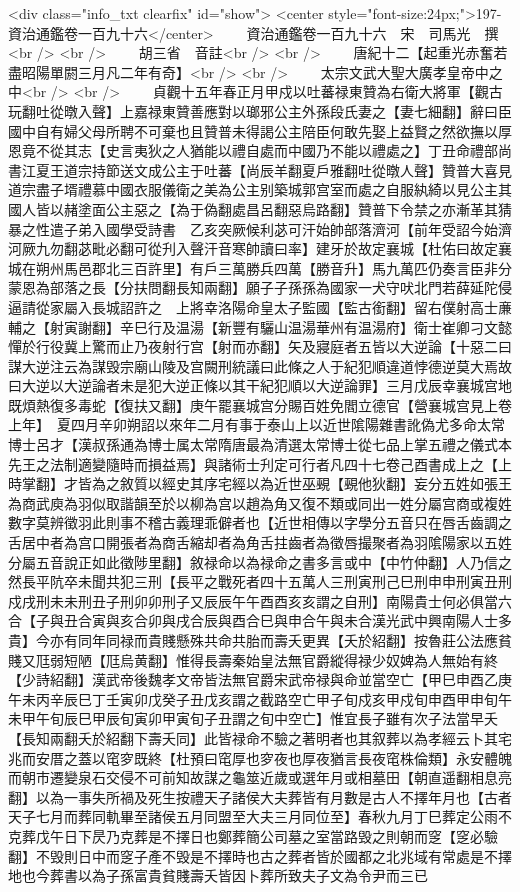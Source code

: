 <div class="info_txt clearfix" id="show">
<center style="font-size:24px;">197-資治通鑑卷一百九十六</center>
  　　資治通鑑卷一百九十六　宋　司馬光　撰<br />
<br />
　　胡三省　音註<br />
<br />
　　唐紀十二【起重光赤奮若盡昭陽單閼三月凡二年有奇】<br />
<br />
　　太宗文武大聖大廣孝皇帝中之中<br />
<br />
　　貞觀十五年春正月甲戍以吐蕃禄東贊為右衛大將軍【觀古玩翻吐從暾入聲】上嘉禄東贊善應對以瑯邪公主外孫段氏妻之【妻七細翻】辭曰臣國中自有婦父母所聘不可棄也且贊普未得謁公主陪臣何敢先娶上益賢之然欲撫以厚恩竟不從其志【史言夷狄之人猶能以禮自處而中國乃不能以禮處之】丁丑命禮部尚書江夏王道宗持節送文成公主于吐蕃【尚辰羊翻夏戶雅翻吐從暾人聲】贊普大喜見道宗盡子壻禮慕中國衣服儀衛之美為公主别築城郭宫室而處之自服紈綺以見公主其國人皆以赭塗面公主惡之【為于偽翻處昌呂翻惡烏路翻】贊普下令禁之亦漸革其猜暴之性遣子弟入國學受詩書　乙亥突厥候利苾可汗始帥部落濟河【前年受詔今始濟河厥九勿翻苾毗必翻可從刋入聲汗音寒帥讀曰率】建牙於故定襄城【杜佑曰故定襄城在朔州馬邑郡北三百許里】有戶三萬勝兵四萬【勝音升】馬九萬匹仍奏言臣非分蒙恩為部落之長【分扶問翻長知兩翻】願子子孫孫為國家一犬守吠北門若薛延陀侵逼請從家屬入長城詔許之　上將幸洛陽命皇太子監國【監古銜翻】留右僕射高士亷輔之【射寅謝翻】辛巳行及温湯【新豐有驪山温湯華州有温湯府】衛士崔卿刁文懿憚於行役冀上驚而止乃夜射行宫【射而亦翻】矢及寢庭者五皆以大逆論【十惡二曰謀大逆注云為謀毁宗廟山陵及宫闕刑統議曰此條之人于紀犯順違道悖德逆莫大焉故曰大逆以大逆論者未是犯大逆正條以其干紀犯順以大逆論罪】三月戊辰幸襄城宫地既煩熱復多毒蛇【復扶又翻】庚午罷襄城宫分賜百姓免閻立德官【營襄城宫見上卷上年】　夏四月辛卯朔詔以來年二月有事于泰山上以近世隂陽雜書訛偽尤多命太常博士呂才【漢叔孫通為博士属太常隋唐最為清選太常博士從七品上掌五禮之儀式本先王之法制適變隨時而損益焉】與諸術士刋定可行者凡四十七卷己酉書成上之【上時掌翻】才皆為之敘質以經史其序宅經以為近世巫覡【覡他狄翻】妄分五姓如張王為商武庾為羽似取諧韻至於以柳為宫以趙為角又復不類或同出一姓分屬宫商或複姓數字莫辨徵羽此則事不稽古義理乖僻者也【近世相傳以字學分五音只在唇舌齒調之舌居中者為宫口開張者為商舌縮却者為角舌拄齒者為徵唇撮聚者為羽隂陽家以五姓分屬五音說正如此徵陟里翻】敘禄命以為禄命之書多言或中【中竹仲翻】人乃信之然長平阬卒未聞共犯三刑【長平之戰死者四十五萬人三刑寅刑己巳刑申申刑寅丑刑戍戌刑未未刑丑子刑卯卯刑子又辰辰午午酉酉亥亥謂之自刑】南陽貴士何必俱當六合【子與丑合寅與亥合卯與戌合辰與酉合巳與申合午與未合漢光武中興南陽人士多貴】今亦有同年同禄而貴賤懸殊共命共胎而壽夭更異【夭於紹翻】按魯莊公法應貧賤又尫弱短陋【尫烏黄翻】惟得長壽秦始皇法無官爵縱得禄少奴婢為人無始有終【少詩紹翻】漢武帝後魏孝文帝皆法無官爵宋武帝禄與命並當空亡【甲巳申酉乙庚午未丙辛辰巳丁壬寅卯戊癸子丑戊亥謂之截路空亡甲子旬戍亥甲戍旬申酉甲申旬午未甲午旬辰巳甲辰旬寅卯甲寅旬子丑謂之旬中空亡】惟宜長子雖有次子法當早夭【長知兩翻夭於紹翻下壽夭同】此皆禄命不驗之著明者也其叙葬以為孝經云卜其宅兆而安厝之蓋以窀穸既終【杜預曰窀厚也穸夜也厚夜猶言長夜窀株倫類】永安體魄而朝市遷變泉石交侵不可前知故謀之龜筮近歲或選年月或相墓田【朝直遥翻相息亮翻】以為一事失所禍及死生按禮天子諸侯大夫葬皆有月數是古人不擇年月也【古者天子七月而葬同軌畢至諸侯五月同盟至大夫三月同位至】春秋九月丁巳葬定公雨不克葬戊午日下昃乃克葬是不擇日也鄭葬簡公司墓之室當路毁之則朝而窆【窆必驗翻】不毁則日中而窆子產不毁是不擇時也古之葬者皆於國都之北兆域有常處是不擇地也今葬書以為子孫富貴貧賤壽夭皆因卜葬所致夫子文為令尹而三已